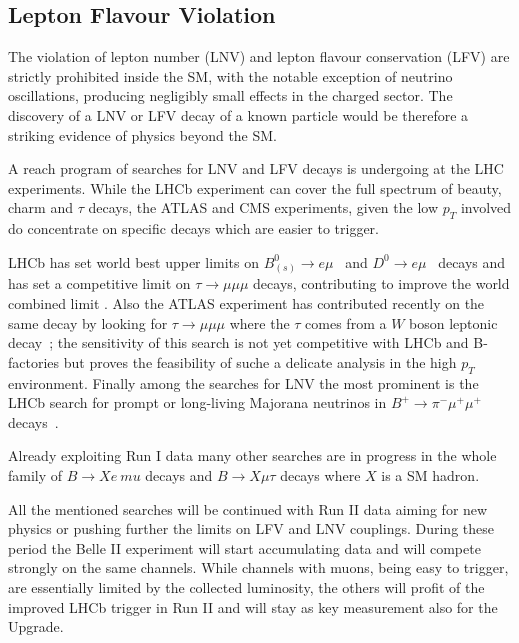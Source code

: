 \subsection{Lepton Flavour Violation}

The violation of lepton number (LNV) and lepton flavour conservation (LFV) are strictly prohibited
inside the SM, with the notable exception of neutrino oscillations, producing negligibly 
small effects in the charged sector. 
The discovery of a LNV or LFV decay of a known particle would be therefore a striking evidence 
of physics beyond the SM. 

A reach program of searches for LNV and LFV decays is undergoing at the LHC experiments. 
While the LHCb experiment can cover the full spectrum of beauty, charm and $\tau$ decays, 
the ATLAS and CMS experiments, given the low $p_T$ involved do concentrate on specific decays which are easier to trigger. 

LHCb has set world best upper limits on $B^0_{(s)} \to e \mu$~\cite{Aaij:2013cby} 
and $D^0 \to e \mu$~\cite{Aaij:2015qmj} decays and has set a competitive
limit on $\tau \to \mu\mu\mu$ decays, contributing to improve the world combined limit \cite{Aaij:2014azz}. 
Also the ATLAS experiment has contributed recently on the same decay by looking for $\tau \to \mu\mu\mu$
where the $\tau$ comes from a $W$ boson leptonic decay~\cite{Aad:2016wce}; the sensitivity of this search is not yet 
competitive with LHCb and B-factories but proves the feasibility of suche a delicate analysis in the high $p_T$ 
environment. 
Finally among the searches for LNV the most prominent is the LHCb search for prompt or long-living Majorana neutrinos 
in $B^+\to \pi^- \mu^+ \mu^+$ decays~\cite{Aaij:2012zr}.

Already exploiting Run I data many other searches are in progress in the whole family of $B\to X e\	mu$ decays and 
$B\to X \mu\tau$ decays where $X$ is a SM hadron. 

All the mentioned searches will be continued with Run II data aiming for new physics or pushing further the limits on 
LFV and LNV couplings. 
During these period the Belle II experiment will start accumulating data and will compete strongly on the same channels. 
While channels with muons, being easy to trigger, are essentially limited by the collected luminosity, the others will
profit of the improved LHCb trigger in Run II and will stay as key measurement also for the Upgrade. 


